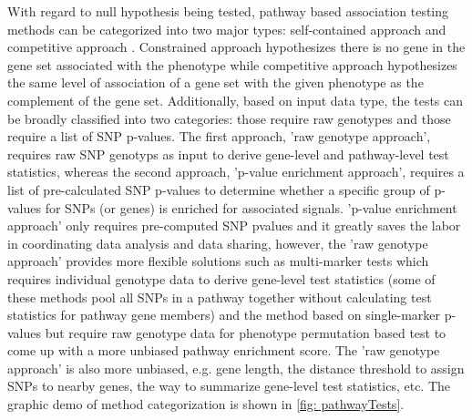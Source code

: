 \documentclass[12pt]{article}
\begin{document}
With regard to null hypothesis being tested, pathway based association testing methods can be categorized into two major types: self-contained approach and competitive approach \cite{Wang2010,Nam2008,Goeman2007}. Constrained approach hypothesizes there is no gene in the gene set associated with the phenotype while competitive approach hypothesizes the same level of association of a gene set with the given phenotype as the complement of the gene set. Additionally, based on input data type, the tests can be broadly classified into two categories: those require raw genotypes and those require a list of SNP p-values. The first approach, 'raw genotype approach', requires raw SNP genotyps as input to derive gene-level and pathway-level test statistics, whereas the second approach, 'p-value enrichment approach', requires a list of pre-calculated SNP p-values to determine whether a specific group of p-values for SNPs (or genes) is enriched for associated signals. 'p-value enrichment approach' only requires pre-computed SNP pvalues and it greatly saves the labor in coordinating data analysis and data sharing, however, the 'raw genotype approach' provides more flexible solutions such as multi-marker tests which requires individual genotype data to derive gene-level test statistics (some of these methods pool all SNPs in a pathway together without calculating test statistics for pathway gene members) and the method based on single-marker p-values but require raw genotype data for phenotype permutation based test to come up with a more unbiased pathway enrichment score. The 'raw genotype approach' is also more unbiased, e.g. gene length, the distance threshold to assign SNPs to nearby genes, the way to summarize gene-level test statistics, etc. The graphic demo of method categorization is shown in \ref{fig: pathwayTests}.
\end{document}
